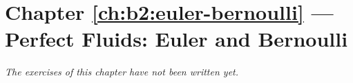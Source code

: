 \section*{Chapter \ref{ch:b2:euler-bernoulli} --- Perfect Fluids: Euler and Bernoulli}


\emph{The exercises of this chapter have not been written yet.}
